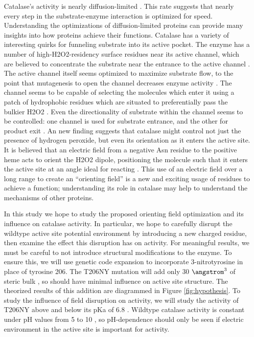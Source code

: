 \documentclass[journal=jacsat,manuscript=article]{achemso}
\begin{document}
Catalase's activity is nearly diffusion-limited \cite{kcatkm, difflimit}. This rate suggests that nearly every step in the substrate-enzyme interaction is optimized for speed. Understanding the optimizations of diffusion-limited proteins can provide many insights into how proteins achieve their functions. Catalase has a variety of interesting quirks for funneling substrate into its active pocket. The enzyme has a number of high-H2O2-residency surface residues near its active channel, which are believed to concentrate the substrate near the entrance to the active channel \cite{concentrateh2o2}. The active channel itself seems optimized to maximize substrate flow, to the point that mutagenesis to open the channel decreases enzyme activity \cite{substrateflow}. The channel seems to be capable of selecting the molecules which enter it using a patch of hydrophobic residues which are situated to preferentially pass the bulkier H2O2 \cite{molecularruler}. Even the directionality of substrate within the channel seems to be controlled: one channel is used for substrate entrance, and the other for product exit \cite{lateralchannel}. An new finding suggests that catalase might control not just the presence of hydrogen peroxide, but even its orientation as it enters the active site. It is believed that an electric field from a negative Asn residue to the positive heme acts to orient the H2O2 dipole, positioning the molecule such that it enters the active site at an angle ideal for reacting \cite{electricpotential}. This use of an electric field over a long range to create an ``orienting field'' is a new and exciting usage of residues to achieve a function; understanding its role in catalase may help to understand the mechanisms of other proteins.

In this study we hope to study the proposed orienting field optimization and its influence on catalase activity. In particular, we hope to carefully disrupt the wildtype active site potential environment by introducing a new charged residue, then examine the effect this disruption has on activity. For meaningful results, we must be careful to not introduce structural modifications to the enzyme. To ensure this, we will use genetic code expansion to incorporate 3-nitrotyrosine in place of tyrosine 206. The T206NY mutation will add only 30 $\angstrom^3$ of steric bulk \cite{3ntsize}, so should have minimal influence on active site structure. The theorized results of this addition are diagrammed in Figure \ref{fig:hypothesis}. To study the influence of field disruption on activity, we will study the activity of T206NY above and below its pKa of 6.8 \cite{3ntsize}. Wildtype catalase activity is constant under pH values from 5 to 10 \cite{phdependence,kcatkm}, so pH-dependence should only be seen if electric environment in the active site is important for activity.\\
\end{document}
